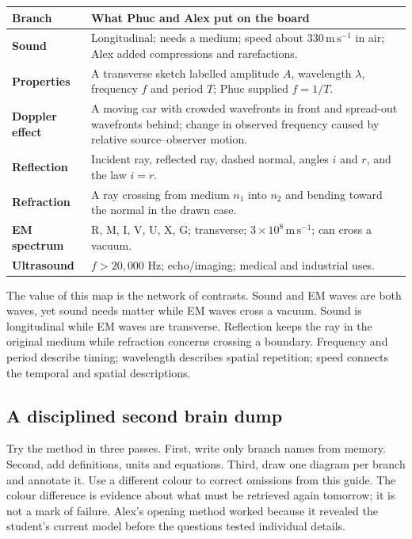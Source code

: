\documentclass[11pt,a4paper]{article}
\begin{document}
\begin{tabularx}{\linewidth}{>{\bfseries}p{.20\linewidth}X}
\toprule Branch & What Phuc and Alex put on the board\\\midrule
Sound & Longitudinal; needs a medium; speed about $330\,\mathrm{m\,s^{-1}}$ in air; Alex added compressions and rarefactions.\\
Properties & A transverse sketch labelled amplitude $A$, wavelength $\lambda$, frequency $f$ and period $T$; Phuc supplied $f=1/T$.\\
Doppler effect & A moving car with crowded wavefronts in front and spread-out wavefronts behind; change in observed frequency caused by relative source--observer motion.\\
Reflection & Incident ray, reflected ray, dashed normal, angles $i$ and $r$, and the law $i=r$.\\
Refraction & A ray crossing from medium $n_1$ into $n_2$ and bending toward the normal in the drawn case.\\
EM spectrum & R, M, I, V, U, X, G; transverse; $3\times10^8\,\mathrm{m\,s^{-1}}$; can cross a vacuum.\\
Ultrasound & $f>20{,}000$ Hz; echo/imaging; medical and industrial uses.\\\bottomrule
\end{tabularx}

The value of this map is the network of contrasts. Sound and EM waves are both waves, yet sound needs matter while EM waves cross a vacuum. Sound is longitudinal while EM waves are transverse. Reflection keeps the ray in the original medium while refraction concerns crossing a boundary. Frequency and period describe timing; wavelength describes spatial repetition; speed connects the temporal and spatial descriptions.

\subsection*{A disciplined second brain dump}
Try the method in three passes. First, write only branch names from memory. Second, add definitions, units and equations. Third, draw one diagram per branch and annotate it. Use a different colour to correct omissions from this guide. The colour difference is evidence about what must be retrieved again tomorrow; it is not a mark of failure. Alex's opening method worked because it revealed the student's current model before the questions tested individual details.
\end{document}
